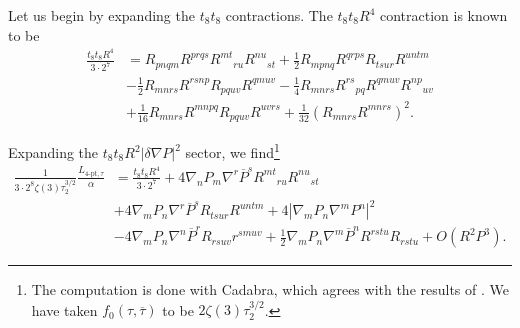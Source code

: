 Let us begin by expanding the $t_8t_8$ contractions.
The $t_8t_8R^4$ contraction is known \cite{Policastro:2008hg} to be 
\begin{equation}
\begin{aligned}
\frac{t_8t_8 R^4}{3 \cdot 2^7}
&=  R_{pnqm} R^{prqs} R^{mt}{}_{ru} R^{nu}{}_{st} + \frac{1}{2}R_{mpnq} R^{qrps} R_{tsur} R^{untm} \\
& - \frac{1}{2}R_{mnrs} R^{rsnp} R_{pquv} R^{qmuv} - \frac{1}{4} R_{mnrs} R^{rs}{}_{pq} R^{qmuv} R^{np}{}_{uv}\\
& + \frac{1}{16} R_{mnrs} R^{mnpq} R_{pquv} R^{uvrs} + \frac{1}{32}(R_{mnrs} R^{mnrs})^2.
\end{aligned}
\label{eq:t8t8R4}
\end{equation}

Expanding the $t_8 t_8 R^2 |\delta \nabla P|^2$ sector, we find\footnote{
The computation is done with Cadabra, which agrees with the results of \cite{Minasian:2015bxa}. We have taken $f_0(\tau,\overline{\tau})$ to be $2\zeta(3) \tau_2^{3/2}$.
}
\begin{equation}
\begin{aligned}
\frac{1}{3 \cdot 2^{8}\zeta(3) \tau_2^{3/2}}\frac{L_{\text{4-pt},\tau}}{\alpha}
&=  \frac{t_8 t_8 R^4}{3 \cdot 2^7}
+ 4 \nabla_n P_m \nabla^r \overline{P}^s R^{mt}{}_{ru} R^{nu}{}_{st} \\
&+ 4 \nabla_m P_n \nabla^r \overline{P}^s R_{tsur} R^{untm}
+ 4 |\nabla_m P_n \nabla^m P^n|^2 \\
&- 4 \nabla_m P_n \nabla^n \overline{P}^r R_{rsuv} r^{smuv}
+ \frac{1}{2} \nabla_{m} P_{n} \nabla^{m}\overline{P}^{n}R^{rstu}R_{rstu} + O(R^2 P^3).
\end{aligned}
\end{equation}

